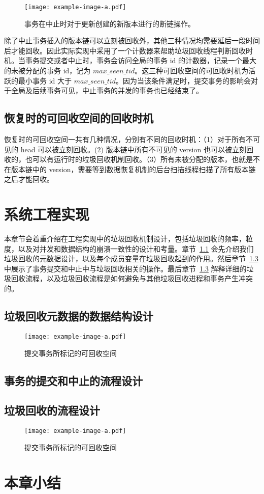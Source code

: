 \begin{figure}
    \centering
    \texttt{[image: example-image-a.pdf]}
    \caption{事务在中止时对于更新创建的新版本进行的断链操作。}
    \label{fig:insert-abort}
\end{figure}

除了中止事务插入的版本链可以立刻被回收外，其他三种情况均需要延后一段时间后才能回收。因此实际实现中采用了一个计数器来帮助垃圾回收线程判断回收时机。当事务提交或者中止时，事务会访问全局的事务 id 的计数器，记录一个最大的未被分配的事务 id，记为 $max\_seen\_tid$。这三种可回收空间的可回收时机为活跃的最小事务 id 大于 $max\_seen\_tid$。因为当该条件满足时，提交事务的影响会对于全局及后续事务可见，中止事务的并发的事务也已经结束了。

\subsection{恢复时的可回收空间的回收时机}

恢复时的可回收空间一共有几种情况，分别有不同的回收时机：（1）对于所有不可见的 head 可以被立刻回收。(2) 版本链中所有不可见的 version 也可以被立刻回收的，也可以有运行时的垃圾回收机制回收。（3）所有未被分配的版本，也就是不在版本链中的 version，需要等到数据恢复机制的后台扫描线程扫描了所有版本链之后才能回收。


\section{系统工程实现}
\label{sec:implement}

本章节会着重介绍在工程实现中的垃圾回收机制设计，包括垃圾回收的频率，粒度，以及对并发和数据结构的崩溃一致性的设计和考量。章节~\ref{ssec:gc-metadata} 会先介绍我们垃圾回收的元数据设计，以及每个成员变量在垃圾回收起到的作用。然后章节~\ref{ssec:gc-implement} 中展示了事务提交和中止中与垃圾回收相关的操作。最后章节~\ref{ssec:gc-implement} 解释详细的垃圾回收流程，以及垃圾回收流程是如何避免与其他垃圾回收进程和事务产生冲突的。

\subsection{垃圾回收元数据的数据结构设计}
\label{ssec:gc-metadata}

\begin{figure}
    \centering
    \texttt{[image: example-image-a.pdf]}
    \caption{提交事务所标记的可回收空间}
    \label{fig:gc-item}
\end{figure}

\subsection{事务的提交和中止的流程设计}
\label{ssec:commit-abort}


\subsection{垃圾回收的流程设计}
\label{ssec:gc-implement}

\begin{figure}
    \centering
    \texttt{[image: example-image-a.pdf]}
    \caption{提交事务所标记的可回收空间}
    \label{fig:gc-implemnt}
\end{figure}


\section{本章小结}
